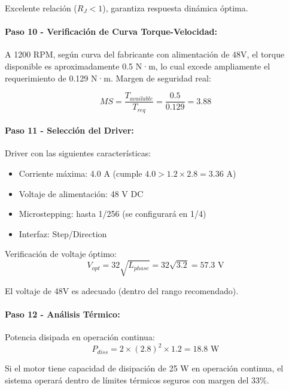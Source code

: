 Excelente relación ($R_J < 1$), garantiza respuesta dinámica óptima.

\paragraph{Paso 10 - Verificación de Curva Torque-Velocidad:}

A 1200 RPM, según curva del fabricante con alimentación de 48V, el torque disponible es aproximadamente 0.5 N·m, lo cual excede ampliamente el requerimiento de 0.129 N·m. Margen de seguridad real:

\begin{equation}
MS = \frac{T_{available}}{T_{req}} = \frac{0.5}{0.129} = 3.88
\end{equation}

\paragraph{Paso 11 - Selección del Driver:}

Driver con las siguientes características:
\begin{itemize}
    \item Corriente máxima: 4.0 A (cumple $4.0 > 1.2 \times 2.8 = 3.36$ A)
    \item Voltaje de alimentación: 48 V DC
    \item Microstepping: hasta 1/256 (se configurará en 1/4)
    \item Interfaz: Step/Direction
\end{itemize}

Verificación de voltaje óptimo:
\begin{equation}
V_{opt} = 32\sqrt{L_{phase}} = 32\sqrt{3.2} = 57.3 \text{ V}
\end{equation}

El voltaje de 48V es adecuado (dentro del rango recomendado).

\paragraph{Paso 12 - Análisis Térmico:}

Potencia disipada en operación continua:
\begin{equation}
P_{diss} = 2 \times (2.8)^2 \times 1.2 = 18.8 \text{ W}
\end{equation}

Si el motor tiene capacidad de disipación de 25 W en operación continua, el sistema operará dentro de límites térmicos seguros con margen del 33\%.


